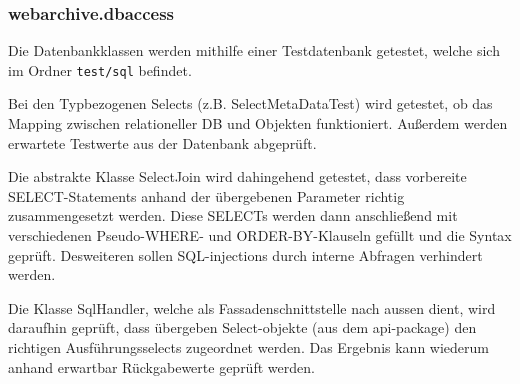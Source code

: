 	\subsubsection{webarchive.dbaccess}
		Die Datenbankklassen werden mithilfe einer Testdatenbank getestet, welche sich im Ordner \lstinline{test/sql} befindet.

		Bei den Typbezogenen Selects (z.B. SelectMetaDataTest) wird getestet, 
		ob das Mapping zwischen relationeller DB und Objekten funktioniert.
		Außerdem werden erwartete Testwerte aus der Datenbank abgeprüft.
		
		Die abstrakte Klasse SelectJoin wird dahingehend getestet, 
		dass vorbereite SELECT-Statements anhand der übergebenen Parameter richtig zusammengesetzt werden.
		Diese SELECTs werden dann anschließend mit verschiedenen Pseudo-WHERE- und ORDER-BY-Klauseln gefüllt
		und die Syntax geprüft.
		Desweiteren sollen SQL-injections durch interne Abfragen verhindert werden.

		Die Klasse SqlHandler, welche als Fassadenschnittstelle nach aussen dient, wird daraufhin
		geprüft, dass übergeben Select-objekte (aus dem api-package) den richtigen Ausführungsselects zugeordnet werden. Das Ergebnis kann wiederum anhand erwartbar Rückgabewerte geprüft werden.
